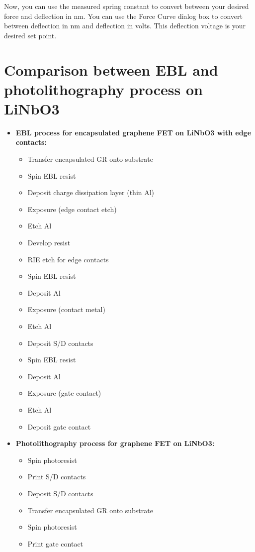 \documentclass[double,12pt,1in]{beavtex}
\begin{document}
Now, you can use the measured spring constant to convert between your desired force and deflection in nm. You can use the Force Curve dialog box to convert between deflection in nm and deflection in volts. This deflection voltage is your desired set point.





\section{Comparison between EBL and photolithography process on LiNbO3}
\begin{itemize}
    \item \textbf{EBL process for encapsulated graphene FET on LiNbO3 with edge contacts:}
    \begin{itemize}
    \item Transfer encapsulated GR onto substrate
    \item Spin EBL resist
    \item Deposit charge dissipation layer (thin Al)
    \item Exposure (edge contact etch)
    \item Etch Al
    \item Develop resist
    \item RIE etch for edge contacts
    \item Spin EBL resist
    \item Deposit Al
    \item Exposure (contact metal)
    \item Etch Al
    \item Deposit S/D contacts
    \item Spin EBL resist
    \item Deposit Al
    \item Exposure (gate contact)
    \item Etch Al
    \item Deposit gate contact
    \end{itemize}
    \item \textbf{Photolithography process for graphene FET on LiNbO3:}
    \begin{itemize}
    \item Spin photoresist
    \item Print S/D contacts
    \item Deposit S/D contacts
    \item Transfer encapsulated GR onto substrate
    \item Spin photoresist
    \item Print gate contact
    \end{itemize}
    \end{itemize}
    
\end{document}
